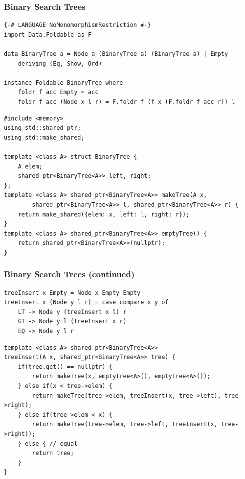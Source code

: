 \documentclass{beamer}
\begin{document}
\begin{frame}[fragile]
\frametitle{Binary Search Trees}
\begin{Verbatim}[frame=single, fontsize=\scriptsize]
{-# LANGUAGE NoMonomorphismRestriction #-}
import Data.Foldable as F

data BinaryTree a = Node a (BinaryTree a) (BinaryTree a) | Empty
    deriving (Eq, Show, Ord)

instance Foldable BinaryTree where
    foldr f acc Empty = acc
    foldr f acc (Node x l r) = F.foldr f (f x (F.foldr f acc r)) l
\end{Verbatim}
\begin{Verbatim}[frame=single, fontsize=\scriptsize]
#include <memory>
using std::shared_ptr;
using std::make_shared;

template <class A> struct BinaryTree {
    A elem;
    shared_ptr<BinaryTree<A>> left, right;
};
template <class A> shared_ptr<BinaryTree<A>> makeTree(A x,
        shared_ptr<BinaryTree<A>> l, shared_ptr<BinaryTree<A>> r) {
    return make_shared({elem: x, left: l, right: r});
}
template <class A> shared_ptr<BinaryTree<A>> emptyTree() {
    return shared_ptr<BinaryTree<A>>(nullptr);
}
\end{Verbatim}
\end{frame}

\begin{frame}[fragile]
\frametitle{Binary Search Trees (continued)}
\begin{Verbatim}[frame=single, fontsize=\scriptsize]
treeInsert x Empty = Node x Empty Empty
treeInsert x (Node y l r) = case compare x y of
    LT -> Node y (treeInsert x l) r
    GT -> Node y l (treeInsert x r)
    EQ -> Node y l r
\end{Verbatim}

\begin{Verbatim}[frame=single, fontsize=\scriptsize]
template <class A> shared_ptr<BinaryTree<A>>
treeInsert(A x, shared_ptr<BinaryTree<A>> tree) {
    if(tree.get() == nullptr) {
        return makeTree(x, emptyTree<A>(), emptyTree<A>());
    } else if(x < tree->elem) {
        return makeTree(tree->elem, treeInsert(x, tree->left), tree->right);
    } else if(tree->elem < x) {
        return makeTree(tree->elem, tree->left, treeInsert(x, tree->right));
    } else { // equal
        return tree;
    }
}
\end{Verbatim}
\end{frame}
\end{document}
